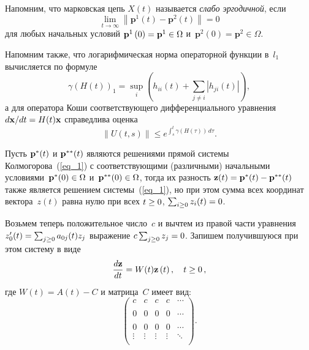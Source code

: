 \begin{multicols}{2}
    
Напомним, что марковская цепь $X(t)$ называется \textit{слабо 
эргодичной}, если
$$ 
\lim\limits_{t\rightarrow \infty }\left\| \mathbf{p}^1\left( t\right) -\mathbf{p}^2\left( t\right) \right\| =0 
$$ 
для любых начальных условий 
$\mathbf{p}^1\left( 0\right) \hm=\mathbf{p}^1\in \Omega$ и~$\mathbf{p}^2\left( 
0\right) =\mathbf{p}^2\in \Omega.$
    
    Напомним также, что логарифмическая норма операторной функции в~$l_1$ 
вычисляется по формуле
    \begin{equation*}
        \gamma \left( H\left(t\right) \right)_{1} = \sup\limits_i 
\left(h_{ii}\left(t\right) + \sum\limits_{j\neq i} \left\vert h_{ji}\left(t\right)\right\vert \right),
    \end{equation*}
    \noindent 
    а  для оператора Коши соответствующего дифференциального 
уравнения ${d\vx}/{dt}\hm=H(t)\vx$ справедлива оценка
    \begin{equation*}
        \|U\left(t,s\right)\| \le e^{\int\nolimits_s^t \gamma\left(H(\tau)\right)\, 
d\tau}.     
    \end{equation*}

\bigskip

Пусть $ {\mathbf p}^*(t) $  и $ {\mathbf p}^{**}(t) $ являются решениями прямой системы 
Колмогорова~(\ref{eq_1}) с соответствующими (различными)
начальными условиями~$ \vp^*(0)\hm \in \Omega $ и~$ {\mathbf p}^{**}(0) \in \Omega $, тогда 
их разность $ \vz(t) \hm= \vp^*(t) \hm- \vp^{**}(t)$ также является решением системы~(\ref{eq_1}), 
но при этом сумма всех координат вектора~$z(t)$ равна нулю при 
всех $t\hm \ge 0$, $ \sum\nolimits_{i\ge 0} z_i(t) \hm= 0 $.

Возьмем теперь положительное число~$c$ и вычтем из правой части уравнения 
$z'_0(t)\hm = \sum\nolimits_{j \ge 0} a_{0j}(t)z_j $ выражение  $ c\sum\nolimits_{j \ge 0} z_j \hm= 0$.
Запишем по\-лу\-чив\-шу\-юся при этом систему в виде
\begin{equation}
    \displaystyle\frac{\displaystyle d{\mathbf z} \mathstrut}{\displaystyle dt\mathstrut}=W(t){\mathbf z} \left(t\right), \quad t\ge 0\,, 
    \label{s22}
\end{equation}
где  $ W(t) = A\left( t\right)-C $ и матрица~$C$ имеет вид:
\begin{equation}
 \left(
    \begin{array}{ccccc}
        c & c  & c  & c  & \cdots \\
        \\
        0 & 0 &0  & 0  & \cdots \\
        \\
        0 & 0 & 0 & 0    & \cdots \\
        \vdots   & \vdots & \vdots  & \vdots    & \ddots \\
    \end{array}
    \right).
    \label{m2}
\end{equation}



\end{multicols}
